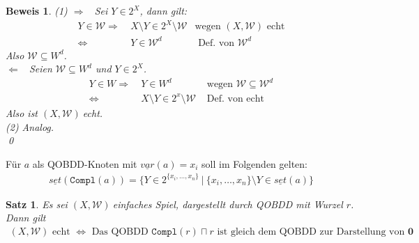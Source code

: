 \documentclass[ngerman]{scrartcl}
\theoremstyle{custom}
\newtheorem{ms}[mdef]{Satz}
\newtheorem*{bw}{Beweis}
\newcommand{\0}{\mathbf{0}}
\newcommand{\1}{\mathbf{L}}
\newcommand{\var}{\underline{var}}
\newcommand{\set}{\underline{set}}
\newcommand{\sg}{$(X,\mathcal{W})~$}
\newcommand{\W}{\mathcal{W}}
\begin{document}
\begin{bw}
(1) \glqq $\Rightarrow$\grqq~ Sei $Y \in 2^X$, dann gilt:
\begin{align*}
Y \in \W \Rightarrow&~ X \setminus Y \in 2^X \setminus \W & \text{
  wegen } (X,\W)
\text{ echt}\\
\Leftrightarrow&~ Y \in \W^d & \text{ Def. von } \W^d
\end{align*}
Also $\W \subseteq W^d$.\\
\glqq $\Leftarrow$\grqq~ Seien $\W \subseteq W^d$ und $Y \in 2^X$.
\begin{align*}
Y \in W \Rightarrow&~ Y \in W^d & \text{ wegen } \W \subseteq \W^d\\
\Leftrightarrow&~ X \setminus Y \in 2^x \setminus \W & \text{ Def. von
 echt}
\end{align*}
Also ist \sg echt.\\

(2) Analog.\\

\qed
\end{bw}
F\"ur $a$ als QOBDD-Knoten mit $\var(a)=x_i$ soll im Folgenden gelten:
\begin{align*}
\set(\texttt{Compl}(a)) = \{ Y \in 2^{\{x_i,\dots,x_n\}}
~|~ \{x_i, \dots, x_n\} \setminus Y \in \set(a)\}
\end{align*}

\begin{ms}
Es sei \sg einfaches Spiel, dargestellt durch QOBDD mit Wurzel
$r$. Dann gilt
\begin{align*}
(X,\W) \text{ echt } \Leftrightarrow \text{ Das QOBDD }
\texttt{Compl}(r) \sqcap r \text{ ist gleich dem QOBDD zur Darstellung
  von } \0
\end{align*}
\end{ms}
\end{document}
